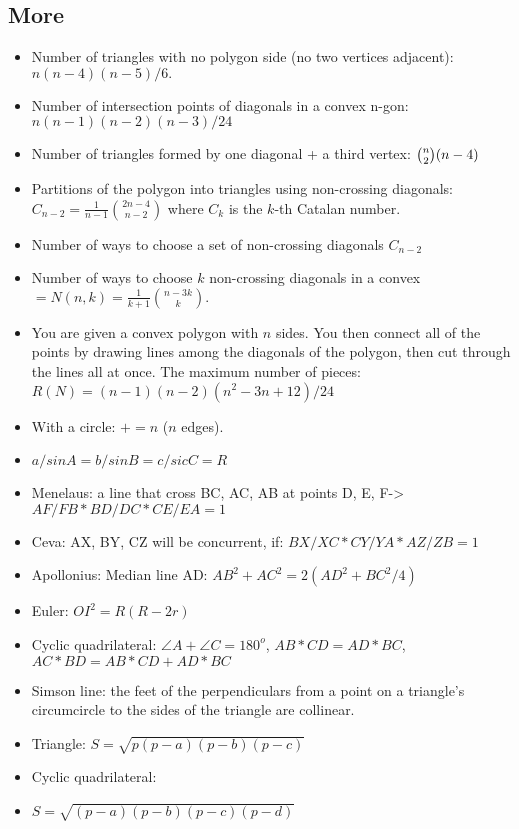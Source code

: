 \documentclass[11pt,a4paper]{article}
\begin{document}
\begin{multicols*}{2}
\subsection{More}
\begin{itemize}
    \item Number of triangles with no polygon side (no two vertices adjacent): $n( n - 4 )( n - 5 ) / 6.$
    \item Number of intersection points of diagonals in a convex n-gon: $n(n-1)(n-2)(n-3) / 24$
    \item Number of triangles formed by one diagonal + a third vertex: $\tbinom{n}{2} (n - 4)$
    \item Partitions of the polygon into triangles using non-crossing diagonals: $C_{n-2} = \frac{1}{n - 1} \binom{2n - 4}{n - 2}$ where $C_k$ is the $k$-th Catalan number.
    \item Number of ways to choose a set of non-crossing diagonals $C_{n - 2}$
    \item Number of ways to choose $k$ non-crossing diagonals in a convex $= N(n, k) = \frac{1}{k + 1} \binom{n - 3k}{k}.$
    \item You are given a convex polygon with $n$ sides. You then connect all of the points by drawing lines among the diagonals of the polygon, then cut through the lines all at once. The maximum number of pieces: $R(N) = (n - 1)(n - 2)(n^2 - 3n + 12)/24$
    \item With a circle: $+= n$ ($n$ edges).
    \item $a/sinA = b/sinB = c/sicC = R$
    \item Menelaus: a line that cross BC, AC, AB at points D, E, F-> $ AF/FB * BD/DC * CE/EA = 1$
    \item Ceva: AX, BY, CZ will be concurrent, if: $BX/XC * CY/YA * AZ/ZB = 1$
    \item Apollonius: Median line AD: $AB^2 + AC^2 = 2(AD^2 + BC^2/4)$
    \item Euler: $OI^2 = R(R - 2r)$
    \item Cyclic quadrilateral: $\angle A + \angle C = 180^o$, $AB * CD = AD * BC$, $AC * BD = AB * CD + AD * BC$
    \item Simson line: the feet of the perpendiculars from a point on a triangle's circumcircle to the sides of the triangle are collinear.
    \item Triangle: $S = \sqrt{p(p - a)(p - b)(p - c)}$
    \item Cyclic quadrilateral: 
    \item $S = \sqrt{(p - a)(p - b)(p - c)(p - d)}$
\end{itemize}




\end{multicols*}
\end{document}
